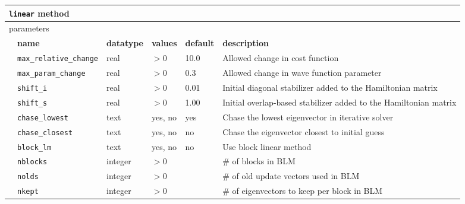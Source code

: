 \begin{table}[h]
\begin{center}
\begin{tabularx}{\textwidth}{l l l l l l }
\hline
\multicolumn{6}{l}{\texttt{linear} method} \\
\hline
\multicolumn{2}{l}{parameters}  & \multicolumn{4}{l}{}\\
   &   \bfseries name     & \bfseries datatype & \bfseries values & \bfseries default   & \bfseries description \\
   &   \texttt{max\_relative\_change} &  real     & $>0$ & 10.0 & Allowed change in cost function\\
   &   \texttt{max\_param\_change} &  real     & $>0$ & 0.3 & Allowed change in wave function parameter\\
   &   \texttt{shift\_i} &  real     & $>0$ & 0.01 & Initial diagonal      stabilizer added to the Hamiltonian matrix\\
   &   \texttt{shift\_s} &  real     & $>0$ & 1.00 & Initial overlap-based stabilizer added to the Hamiltonian matrix\\
   &   \texttt{chase\_lowest} &  text   & yes, no & yes & Chase the lowest eigenvector in iterative solver\\
   &   \texttt{chase\_closest} &  text   & yes, no & no & Chase the eigenvector closest to initial guess\\
   &   \texttt{block\_lm} &  text   & yes, no & no & Use block linear method\\
   &   \texttt{nblocks} &  integer   & $>0$ &  & \# of blocks in BLM\\
   &   \texttt{nolds} &  integer   & $>0$ &  & \# of old update vectors used in BLM\\
   &   \texttt{nkept} &  integer   & $>0$ &  & \# of eigenvectors to keep per block in BLM\\
  \hline
\end{tabularx}
\end{center}
\end{table}

